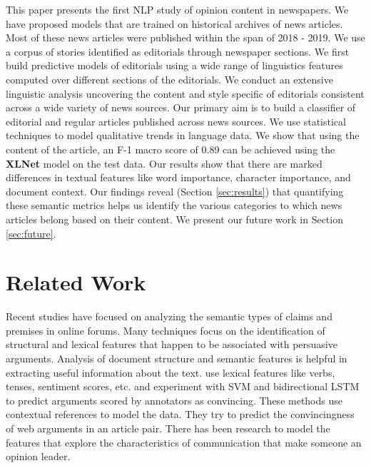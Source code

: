 \documentclass[11pt]{article}
\begin{document}
This paper presents the first NLP study of opinion content in newspapers.  We have proposed models that are trained on historical archives of news articles. Most of these news articles were published within the span of 2018 - 2019. We use a corpus of stories identified as editorials through newspaper sections. We first build predictive models of editorials using a wide range of linguistics features computed over different sections of the editorials. We conduct an extensive linguistic analysis uncovering the content and style specific of editorials consistent across a wide variety of news sources. Our primary aim is to build a classifier of editorial and regular articles published across news sources. We use statistical techniques to model qualitative trends in language data. We show that using the content of the article, an F-1 macro score of 0.89 can be achieved using the \textbf{XLNet} model on the test data. Our results show that there are marked differences in textual features like word importance, character importance, and document context. Our findings reveal (Section \ref{sec:results}) that quantifying these semantic metrics helps us identify the various categories to which news articles belong based on their content. We present our future work in Section \ref{sec:future}.



\section{Related Work}
\label{sec:relwork}

Recent studies have focused on analyzing the semantic types of claims and premises in online forums\cite{hidey2017analyzing}.  Many techniques focus on the identification of structural and lexical features that happen to be associated with persuasive arguments. Analysis of document structure and semantic features is helpful in extracting useful information about the text.  use lexical features like verbs, tenses, sentiment scores, etc. and experiment with SVM and bidirectional LSTM to predict arguments scored by annotators as convincing. These methods use contextual references to model the data. They try to predict the convincingness of web arguments in an article pair. There has been research to model the features that explore the characteristics of communication that make someone an opinion leader. 
\end{document}
